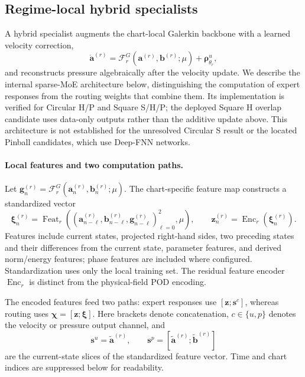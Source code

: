 \subsection{Regime-local hybrid specialists}
\label{sec:hybrid_specialists}

A hybrid specialist augments the chart-local Galerkin backbone with a
learned velocity correction,
\begin{equation}
  \dot{\bm a}^{(r)}
  =\mathcal F_r^G(\bm a^{(r)},\bm b^{(r)};\mu)
   +\bm\rho^u_{\theta_r},
  \label{eq:main_specialist}
\end{equation}
and reconstructs pressure algebraically after the velocity update.
We describe the internal sparse-MoE architecture below, distinguishing
the computation of expert responses from the routing weights that
combine them. Its implementation is verified for Circular H/P and
Square S/H/P; the deployed Square H overlap candidate uses data-only
outputs rather than the additive update above. This architecture is
not established for the unresolved Circular S result or the located
Pinball candidates, which use Deep-FNN networks.

\paragraph{Local features and two computation paths.}
Let $\bm g_n^{(r)}=
\mathcal F_r^G(\bm a_n^{(r)},\bm b_n^{(r)};\mu)$.
The chart-specific feature map constructs a standardized vector
\begin{equation}
  \bm\xi_n^{(r)}
  =\operatorname{Feat}_r\!\left(
    (\bm a_{n-\ell}^{(r)},\bm b_{n-\ell}^{(r)},
     \bm g_{n-\ell}^{(r)})_{\ell=0}^{2},\mu\right),
  \qquad
  \bm z_n^{(r)}=\operatorname{Enc}_r(\bm\xi_n^{(r)}).
  \label{eq:main_specialist_features}
\end{equation}
Features include current states, projected right-hand sides, two
preceding states and their differences from the current state,
parameter features, and derived norm/energy features; phase features
are included where configured. Standardization uses only the local
training set. The residual feature encoder $\operatorname{Enc}_r$
is distinct from the physical-field POD encoding.

The encoded features feed two paths: expert responses use
$[\bm z;\bm s^c]$, whereas routing uses
$\bm\chi=[\bm z;\bm\xi]$. Here brackets denote concatenation,
$c\in\{u,p\}$ denotes the velocity or pressure output channel, and
\begin{equation}
  \bm s^u=\widetilde{\bm a}^{(r)},
  \qquad
  \bm s^p=[\widetilde{\bm a}^{(r)};
            \widetilde{\bm b}^{(r)}]
  \label{eq:main_expert_state_inputs}
\end{equation}
are the current-state slices of the standardized feature vector.
Time and chart indices are suppressed below for readability.

